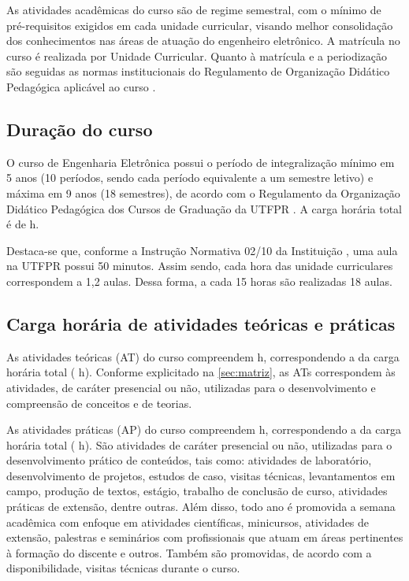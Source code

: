 As atividades acadêmicas do curso são de regime semestral, com o mínimo de pré-requisitos exigidos em cada unidade curricular, visando melhor consolidação dos conhecimentos nas áreas de atuação do engenheiro eletrônico. A matrícula no curso é realizada por Unidade Curricular. Quanto à matrícula e a periodização são seguidas as normas institucionais do Regulamento de Organização Didático Pedagógica aplicável ao curso \cite{rodp}.

\subsection{Duração do curso}

O curso de Engenharia Eletrônica possui o período de integralização mínimo em 5 anos (10 períodos, sendo cada período equivalente a um semestre letivo) e máxima em 9 anos (18 semestres), de acordo com o Regulamento da Organização Didático Pedagógica dos Cursos de Graduação da UTFPR \cite{rodp}. A carga horária total é de \the\value{horasT} h. 

Destaca-se que, conforme a Instrução Normativa 02/10 da Instituição \cite{in2:2010:prograd}, uma aula na UTFPR possui 50 minutos. Assim sendo, cada hora das unidade curriculares correspondem a 1,2 aulas. Dessa forma, a cada 15 horas são realizadas 18 aulas.

\subsection{Carga horária de atividades teóricas e práticas}

As atividades teóricas (AT) do curso compreendem \the\value{horasAT} h, correspondendo a \percentagem{\the\value{horasAT}}{\the\value{horasT}} da carga horária total (\the\value{horasT} h). Conforme explicitado na \autoref{sec:matriz}, as ATs correspondem às atividades, de caráter presencial ou não, utilizadas para o desenvolvimento e compreensão de conceitos e de teorias.


As atividades práticas (AP) do curso compreendem \the\value{horasAP} h, correspondendo a \percentagem{\the\value{horasAP}}{\the\value{horasT}} da carga horária total (\the\value{horasT} h). São atividades de caráter presencial ou não, utilizadas para o desenvolvimento prático de conteúdos, tais como: atividades de laboratório, desenvolvimento de projetos, estudos de caso, visitas técnicas, levantamentos em campo, produção de textos, estágio, trabalho de conclusão de curso, atividades práticas de extensão, dentre outras. Além disso, todo ano é promovida a semana acadêmica com enfoque em atividades científicas, minicursos, atividades de extensão, palestras e seminários com profissionais que atuam em áreas pertinentes à formação do discente e outros. Também são promovidas, de acordo com a disponibilidade, visitas técnicas durante o curso.

